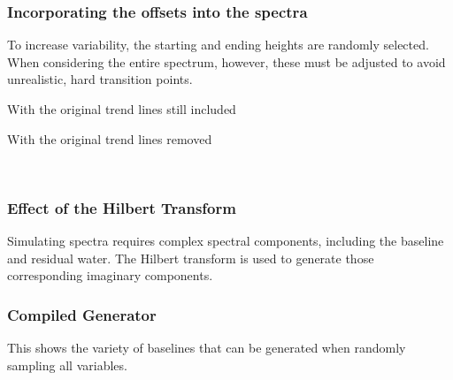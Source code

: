 \documentclass[AMA,LATO1COL]{WileyNJD-v2}
\begin{document}
\newpage
\subsubsection{Incorporating the offsets into the spectra}\label{baseline:incorporating-the-offsets-into-the-spectra}
To increase variability, the starting and ending heights are randomly selected. When considering the entire spectrum, however, these must be adjusted to avoid unrealistic, hard transition points.

\begin{center}
With the original trend lines still included


    \begin{center}
    \end{center}

    
    \newpage 
With the original trend lines removed


    \begin{center}
    \end{center}
    { \hspace*{\fill} \\}
\end{center}

\newpage
\subsubsection{Effect of the Hilbert Transform}\label{baseline:effect-of-the-hilbert-transform}
Simulating spectra requires complex spectral components, including the baseline and residual water. The Hilbert transform is used to generate those corresponding imaginary components. 

    \begin{center}
    \end{center}


\newpage
\subsubsection{Compiled Generator}\label{baseline:compiled-generator}
This shows the variety of baselines that can be generated when randomly sampling all variables.
    \begin{center}
    \end{center}
\end{document}
